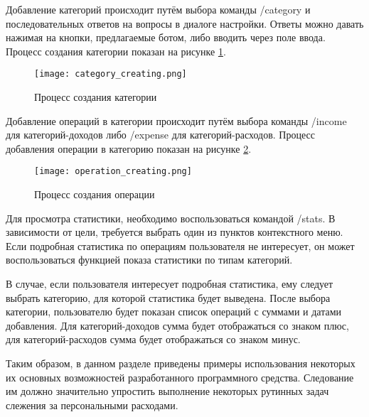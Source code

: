 Добавление категорий происходит путём выбора команды /category и последовательных ответов на вопросы в диалоге настройки. Ответы можно давать нажимая на кнопки, предлагаемые ботом, либо вводить через поле ввода. Процесс создания категории показан на рисунке \ref{fig:manual:category_creating}.

\begin{figure}[ht]
\centering
	\texttt{[image: category\_creating.png]}
	\caption{Процесс создания категории}
	\label{fig:manual:category_creating}
\end{figure}

Добавление операций в категории происходит путём выбора команды /income для категорий-доходов либо /expense для категорий-расходов. Процесс добавления операции в категорию показан на рисунке \ref{fig:manual:operation_creating}.

\begin{figure}[ht]
\centering
	\texttt{[image: operation\_creating.png]}
	\caption{Процесс создания операции}
	\label{fig:manual:operation_creating}
\end{figure}

Для просмотра статистики, необходимо воспользоваться командой /stats. В зависимости от цели, требуется выбрать один из пунктов контекстного меню. Если подробная статистика по операциям пользователя не интересует, он может воспользоваться функцией показа статистики по типам категорий. 

В случае, если пользователя интересует подробная статистика, ему следует выбрать категорию, для которой статистика будет выведена. После выбора категории, пользователю будет показан список операций с суммами и датами добавления. Для категорий-доходов сумма будет отображаться со знаком плюс, для категорий-расходов сумма будет отображаться со знаком минус.

Таким образом, в данном разделе приведены примеры использования некоторых их основных возможностей разработанного программного средства. Следование им должно значительно упростить выполнение некоторых рутинных задач слежения за персональными расходами.
